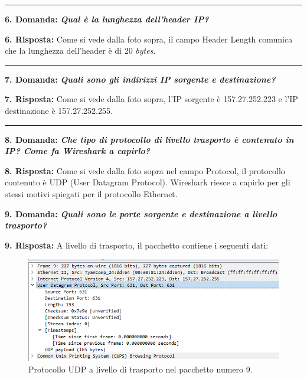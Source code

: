\documentclass[a4paper]{article}
\newcommand{\longline}{\noindent\rule{\textwidth}{0.4pt}}
\begin{document}
	\longline\newline
	
	\noindent
	\textcolor{Red3}{\textbf{6. Domanda:}} \textbf{\emph{Qual è la lunghezza dell'header IP?}}\newline
	
	\noindent
	\textcolor{Green4}{\textbf{6. Risposta:}} Come si vede dalla foto sopra, il campo Header Length comunica che la lunghezza dell'header è di 20 \emph{bytes}.
	
	\longline\newline
	
	\noindent
	\textcolor{Red3}{\textbf{7. Domanda:}} \textbf{\emph{Quali sono gli indirizzi IP sorgente e destinazione?}}\newline
	
	\noindent
	\textcolor{Green4}{\textbf{7. Risposta:}} Come si vede dalla foto sopra, l'IP sorgente è 157.27.252.223 e l'IP destinazione è 157.27.252.255.
	
	\longline\newline
	
	\noindent
	\textcolor{Red3}{\textbf{8. Domanda:}} \textbf{\emph{Che tipo di protocollo di livello trasporto è contenuto in IP? Come fa Wireshark a capirlo?}}\newline
	
	\noindent
	\textcolor{Green4}{\textbf{8. Risposta:}} Come si vede dalla foto sopra nel campo \textsf{Protocol}, il protocollo contenuto è UDP (User Datagram Protocol). Wireshark riesce a capirlo per gli stessi motivi spiegati per il protocollo Ethernet.\newpage
	
	\noindent
	\textcolor{Red3}{\textbf{9. Domanda:}} \textbf{\emph{Quali sono le porte sorgente e destinazione a livello trasporto?}}\newline
	
	\noindent
	\textcolor{Green4}{\textbf{9. Risposta:}} A livello di trasporto, il pacchetto contiene i seguenti dati:
	\begin{figure}[!htp]
		\centering
		\includegraphics[width=\textwidth]{img/wireshark/ex1-4.png}
		\caption{Protocollo UDP a livello di trasporto nel pacchetto numero 9.}
	\end{figure}
	
\end{document}
